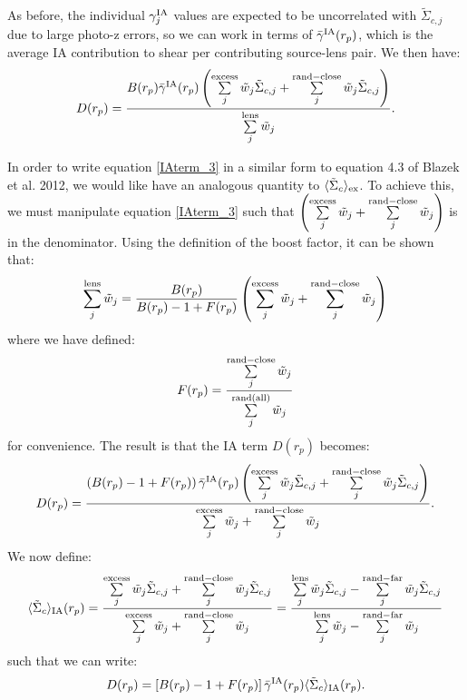 \documentclass[onecolumn,amsmath,aps,fleqn, superscriptaddress]{revtex4}
\begin{document}
{As before, the individual $\gamma^{\rm IA}_j$ values are expected to be uncorrelated with $\tilde{\Sigma}_{c,j}$ due to large photo-z errors, so we can work in terms of $\bar{\gamma}^{\rm IA}(r_p)$, which is the average IA contribution to shear per contributing source-lens pair. We then have:
\begin{equation}
D(r_p) = \frac{B(r_p) \bar{\gamma}^{\rm IA}(r_p)\left(\sum\limits_{j}^{\rm excess} \tilde{w}_j \tilde{\Sigma}_{c,j}+ \sum\limits_{j}^{\rm rand-close} \tilde{w}_j \tilde{\Sigma}_{c,j}\right)}{\sum\limits_{j}^{\rm lens} \tilde{w}_j}.
\label{IAterm_3}
\end{equation}

In order to write equation \ref{IAterm_3} in a similar form to equation 4.3 of Blazek et al. 2012, we would like have an analogous quantity to $\langle \tilde{\Sigma}_c\rangle_{\rm ex}$. To achieve this, we must manipulate equation \ref{IAterm_3} such that $\left(\sum\limits_{j}^{\rm excess} \tilde{w}_j + \sum\limits_{j}^{\rm rand-close} \tilde{w}_j\right)$ is in the denominator. Using the definition of the boost factor, it can be shown that:
\begin{equation}
\sum\limits_{j}^{\rm lens} \tilde{w}_j = \frac{B(r_p)}{B(r_p)-1+F(r_p)} \left(\sum\limits_{j}^{\rm excess} \tilde{w}_j + \sum\limits_{j}^{\rm rand-close} \tilde{w}_j\right)
\label{lens_weights_expand}
\end{equation}
where we have defined:
\begin{equation}
F(r_p) = \frac{\sum\limits^{\rm rand-close}_{j} \tilde{w}_j}{\sum\limits^{\rm rand(all)}_{j} \tilde{w}_j}
\label{Frp}
\end{equation}
for convenience. The result is that the IA term $D(r_p)$ becomes:
\begin{equation}
D(r_p)=\frac{\left(B(r_p)-1 +F(r_p)\right)\bar{\gamma}^{\rm IA}(r_p)\left(\sum\limits_{j}^{\rm excess} \tilde{w}_j \tilde{\Sigma}_{c,j}+ \sum\limits_{j}^{\rm rand-close} \tilde{w}_j \tilde{\Sigma}_{c,j}\right)}{\sum\limits_{j}^{\rm excess} \tilde{w}_j + \sum\limits_{j}^{\rm rand-close} \tilde{w}_j}.
\label{IAterm_4}
\end{equation}
We now define:
\begin{equation}
\langle \tilde{\Sigma}_c\rangle_{\rm IA} (r_p) = \frac{\sum\limits_{j}^{\rm excess} \tilde{w}_j \tilde{\Sigma}_{c,j}+ \sum\limits_{j}^{\rm rand-close} \tilde{w}_j \tilde{\Sigma}_{c,j}}{\sum\limits_{j}^{\rm excess} \tilde{w}_j + \sum\limits_{j}^{\rm rand-close} \tilde{w}_j} = \frac{\sum\limits_{j}^{\rm lens} \tilde{w}_j \tilde{\Sigma}_{c,j}- \sum\limits_{j}^{\rm rand-far} \tilde{w}_j \tilde{\Sigma}_{c,j}}{\sum\limits_{j}^{\rm lens} \tilde{w}_j - \sum\limits_{j}^{\rm rand-far} \tilde{w}_j}
\label{SigmaIA}
\end{equation}
such that we can write:
\begin{equation}
D(r_p)=\left[B(r_p)-1 +F(r_p)\right]\bar{\gamma}^{\rm IA}(r_p)\langle \tilde{\Sigma}_c\rangle_{\rm IA} (r_p).
\label{IAterm_5}
\end{equation}

}
\end{document}
